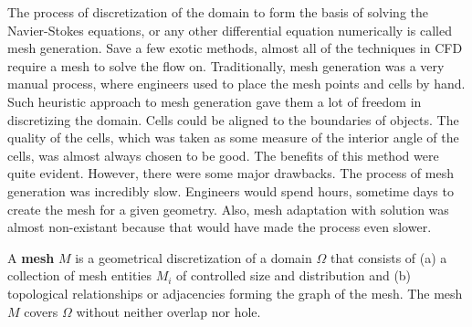 The process of discretization of the domain to form the basis of solving the Navier-Stokes equations, or any other differential equation numerically is called mesh generation. Save a few exotic methods, almost all of the techniques in CFD require a mesh to solve the flow on. Traditionally, mesh generation was a very manual process, where engineers used to place the mesh points and cells by hand. Such heuristic approach to mesh generation gave them a lot of freedom in discretizing the domain. Cells could be aligned to the boundaries of objects. The quality of the cells, which was taken as some measure of the interior angle of the cells, was almost always chosen to be good. The benefits of this method were quite evident. However, there were some major drawbacks. The process of mesh generation was incredibly slow. Engineers would spend hours, sometime days to create the mesh for a given geometry. Also, mesh adaptation with solution was almost non-existant because that would have made the process even slower.

\begin{definition}
A \textbf{mesh} $M$ is a geometrical discretization of a domain $\Omega$ that consists of (a) a collection of mesh entities $M_i$ of controlled size and distribution and (b) topological relationships or adjacencies forming the graph of the mesh. The mesh $M$ covers $\Omega$ without neither overlap nor hole.
\end{definition}

